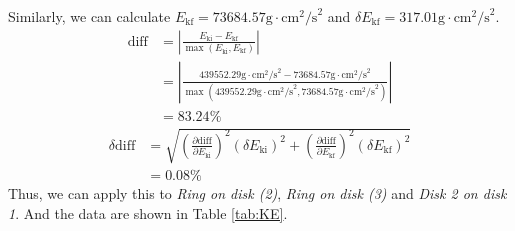 Similarly, we can calculate $E_{\text{kf}}=73684.57\text{g}\cdot\text{cm}^2\text{/s}^2$ and $\delta E_{\text{kf}}=317.01\text{g}\cdot\text{cm}^2\text{/s}^2$.
\begin{equation*}
  \begin{aligned}
    \text{diff} & = |\frac{E_{\text{ki}}-E_{\text{kf}}}{\max{(E_{\text{ki}},E_{\text{kf}})}}|                                                                                                                          \\
                & =|\frac{439552.29\text{g}\cdot\text{cm}^2\text{/s}^2-73684.57\text{g}\cdot\text{cm}^2\text{/s}^2}{\max{(439552.29\text{g}\cdot\text{cm}^2\text{/s}^2,73684.57\text{g}\cdot\text{cm}^2\text{/s}^2)}}| \\
                & =83.24\%
  \end{aligned}
\end{equation*}
\begin{equation*}
  \begin{aligned}
    \delta\text{diff} & = \sqrt{(\frac{\partial \text{diff}}{\partial E_{\text{ki}}})^2(\delta E_{\text{ki}})^2+(\frac{\partial \text{diff}}{\partial E_{\text{kf}}})^2(\delta E_{\text{kf}})^2} \\
                      & =0.08\%
  \end{aligned}
\end{equation*}
Thus, we can apply this to \emph{Ring on disk (2)}, \emph{Ring on disk (3)} and \emph{Disk 2 on disk 1}. And the data are shown in Table \ref{tab:KE}.
